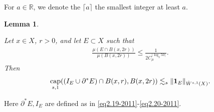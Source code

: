 \documentclass[11pt,leqno]{amsart}
\newtheorem{lemma}[theorem]{Lemma}
\numberwithin{equation}{section}
\theoremstyle{definition}
\DeclareMathOperator{\capp}{cap}
\newcommand{\caps}{\capp_{s,1}}
\begin{document}
	For $a\in \mathbb{R}$, we denote the $\lceil a \rceil$ the smallest integer at least $a$.
	
	\begin{lemma}\label{lemma4.11-Nov.12}
		
		
		Let $x\in X$, $r>0$, and let $E\subset X$ such that 
		\begin{align}\label{lem4.11-1}
			\frac{\mu(E\cap B(x,2r))}{\mu(B(x,2r))}\leq \frac{1}{2C_{\mu}^{\lceil \log_2 50 \rceil}}.
		\end{align}
		Then 
		\begin{equation}\label{eq2.27-22nov}
			\caps((I_E\cup \partial^*E)\cap B(x,r),B(x,2r))\lesssim_s\|{\bf 1}_E\|_{\dot W^{s,1}(X)}.
		\end{equation}
	\end{lemma}
	Here  $\partial^*E, I_E$ are defined as in \eqref{eq2.19-2011}-\eqref{eq2.20-2011}.
\end{document}
